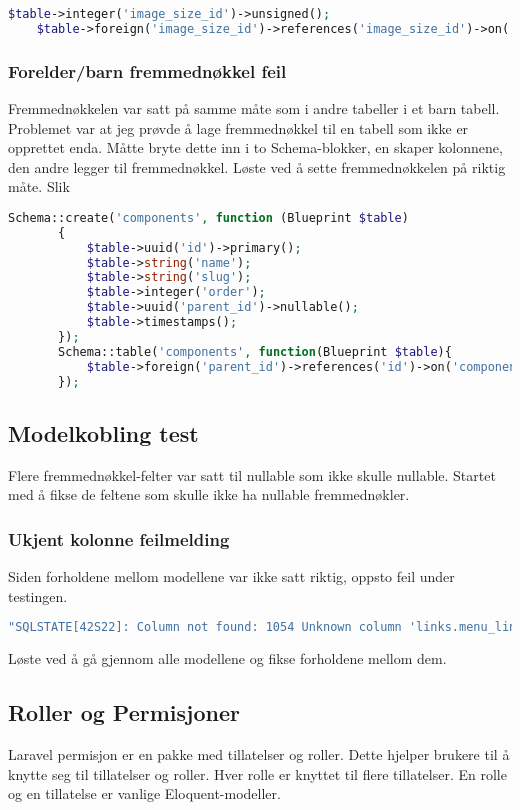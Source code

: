 \begin{lstlisting}[language=PHP]
    $table->integer('image_size_id')->unsigned();
    $table->foreign('image_size_id')->references('image_size_id')->on('image_sizes');
\end{lstlisting}

\subsubsection{Forelder/barn fremmednøkkel feil}
Fremmednøkkelen var satt på samme måte som i andre tabeller i et barn tabell. Problemet var at jeg prøvde å lage fremmednøkkel til en tabell som ikke er opprettet enda.
Måtte bryte dette inn i to Schema-blokker, en skaper kolonnene, den andre legger til fremmednøkkel.\cite{meroje2013lmsrfki}
Løste ved å sette fremmednøkkelen på riktig måte. Slik
\begin{lstlisting}[language=PHP]
Schema::create('components', function (Blueprint $table)
       {
           $table->uuid('id')->primary();
           $table->string('name');
           $table->string('slug');
           $table->integer('order');
           $table->uuid('parent_id')->nullable();
           $table->timestamps();
       });
       Schema::table('components', function(Blueprint $table){
           $table->foreign('parent_id')->references('id')->on('components');
       });
\end{lstlisting}

\subsection{Modelkobling test}
Flere fremmednøkkel-felter var satt til nullable som ikke skulle nullable. Startet med å fikse de feltene som skulle ikke ha nullable fremmednøkler.

\subsubsection{Ukjent kolonne feilmelding}
Siden forholdene mellom modellene var ikke satt riktig, oppsto feil under testingen.
\begin{lstlisting}[language=PHP]
"SQLSTATE[42S22]: Column not found: 1054 Unknown column 'links.menu_link_id' in 'where clause' (SQL: select * from links where links.`menu_link_id` = 3 and links.`menu_link_id` is not null) 
\end{lstlisting}
Løste ved å gå gjennom alle modellene og fikse forholdene mellom dem.

\subsection{Roller og Permisjoner}\cite{spatie2019aupar}
Laravel permisjon er en pakke med tillatelser og roller. Dette hjelper brukere til å knytte seg til tillatelser og roller. Hver rolle er knyttet til flere tillatelser. En rolle og en tillatelse er vanlige Eloquent-modeller\cite{oki2017uail}.
